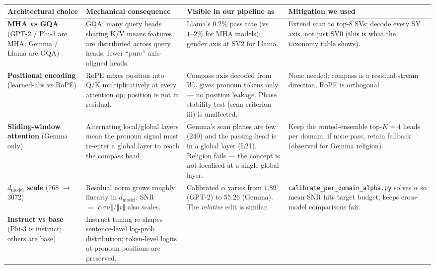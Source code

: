 \documentclass[11pt]{article}
\begin{document}
\begin{tcolorbox}[keybox, title=How each architectural difference propagated into the experiment pipeline]
\small
\begin{center}
\begin{tabular}{@{}p{4.5cm}|p{9cm}|p{8cm}|p{6.5cm}@{}}
\toprule
\textbf{Architectural choice} & \textbf{Mechanical consequence} & \textbf{Visible in our pipeline as} & \textbf{Mitigation we used} \\
\midrule
\textbf{MHA vs GQA} (GPT-2 / Phi-3 are MHA; Gemma / Llama are GQA) &
GQA: many query heads sharing K/V means features are distributed across query heads; fewer ``pure'' axis-aligned heads. &
Llama's $0.2\%$ pass rate (vs $1\text{--}2\%$ for MHA models); gender axis at SV2 for Llama. &
Extend scan to top-8 SVs; decode every SV axis, not just SV0 (this is what the taxonomy table shows). \\
\midrule
\textbf{Positional encoding} (learned-abs vs RoPE) &
RoPE mixes position into Q/K multiplicatively at every attention op; position is not in residual. &
Compass axis decoded from $W_U$ gives pronoun tokens only --- no position leakage. Phase stability test (scan criterion iii) is unaffected. &
None needed; compass is a residual-stream direction, RoPE is orthogonal. \\
\midrule
\textbf{Sliding-window attention} (Gemma only) &
Alternating local/global layers mean the pronoun signal must re-enter a global layer to reach the compass head. &
Gemma's scan planes are few (240) and the passing head is in a global layer (L21). Religion fails --- the concept is not localised at a single global layer. &
Keep the routed-ensemble top-$K=4$ heads per domain; if none pass, retain fallback (observed for Gemma religion). \\
\midrule
\textbf{$d_\text{model}$ scale} (768 $\to$ 3072) &
Residual norm grows roughly linearly in $d_\text{model}$. SNR $ = \Vert \alpha \sigma u \Vert / \Vert r \Vert$ also scales. &
Calibrated $\alpha$ varies from $1.89$ (GPT-2) to $55.26$ (Gemma). The \emph{relative} edit is similar. &
\texttt{calibrate\_per\_domain\_alpha.py} solves $\alpha$ so mean SNR hits target budget; keeps cross-model comparisons fair. \\
\midrule
\textbf{Instruct vs base} (Phi-3 is instruct; others are base) &
Instruct tuning re-shapes sentence-level log-prob distribution; token-level logits at pronoun positions are preserved. &

\end{tabular}
\end{center}
\end{tcolorbox}
\end{document}
